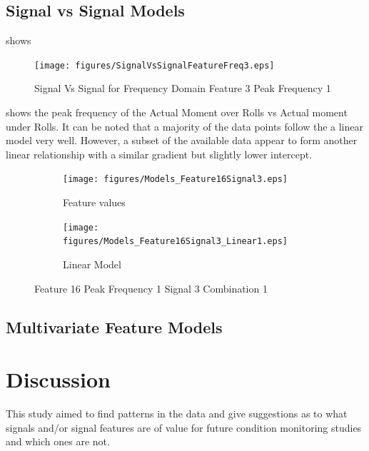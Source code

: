 \documentclass[]{article}
\begin{document}
\subsection{Signal vs Signal Models}
 shows 
\begin{figure}[H]
    \centering
    \texttt{[image: figures/SignalVsSignalFeatureFreq3.eps]}
    \caption{Signal Vs Signal for Frequency Domain Feature 3 Peak Frequency 1}
    \label{fig:SignalVsSignalFeatureFreq3}
\end{figure}
 shows the peak frequency of the Actual Moment over Rolls vs Actual moment under Rolls. It can be noted that a majority of the data points follow the a linear model very well. However, a subset of the available data appear to form another linear relationship with a similar gradient but slightly lower intercept.
\begin{figure}[H]
	\centering
	\begin{subfigure}{.5\textwidth}
		\centering
    		\texttt{[image: figures/Models\_Feature16Signal3.eps]}
	 	\caption{Feature values}
	  	\label{fig:Models_Feature16Signal3}
	\end{subfigure}%
	\begin{subfigure}{.5\textwidth}
	  \centering
 	   	\texttt{[image: figures/Models\_Feature16Signal3\_Linear1.eps]}
	  	\caption{Linear Model}
	  	\label{fig:Models_Feature16Signal3_Linear1}
	\end{subfigure}
   	\caption{Feature 16 Peak Frequency 1 Signal 3 Combination 1}
    \label{fig:Models_Feature16Signal3_Caption}
\end{figure}

\subsection{Multivariate Feature Models}

\clearpage 

\section{Discussion}
This study aimed to find patterns in the data and  give suggestions as to what signals and/or signal features are of value for future condition monitoring studies and which ones are not. 
\end{document}

